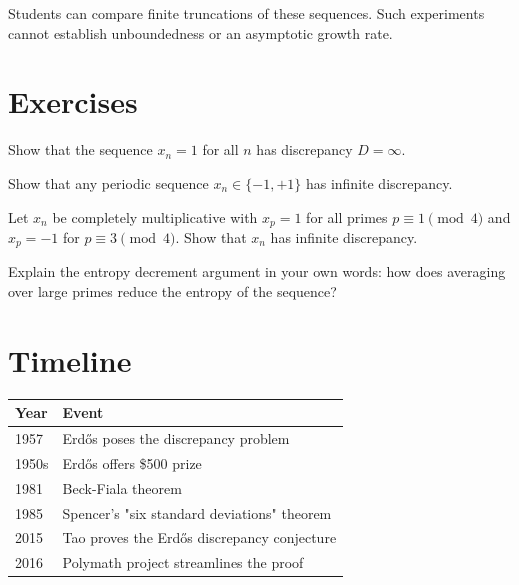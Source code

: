 \begin{highlightbox}
Students can compare finite truncations of these sequences. Such experiments cannot establish unboundedness or an asymptotic growth rate.
\end{highlightbox}

\section{Exercises}

\begin{exercise}[Basic]
Show that the sequence $x_n = 1$ for all $n$ has discrepancy $D = \infty$.
\end{exercise}

\begin{exercise}[Basic]
Show that any periodic sequence $x_n \in \{-1, +1\}$ has infinite discrepancy.
\end{exercise}

\begin{exercise}[Intermediate]
Let $x_n$ be completely multiplicative with $x_p = 1$ for all primes $p \equiv 1 \pmod{4}$ and $x_p = -1$ for $p \equiv 3 \pmod{4}$. Show that $x_n$ has infinite discrepancy.
\end{exercise}

\begin{exercise}[Challenge]
Explain the entropy decrement argument in your own words: how does averaging over large primes reduce the entropy of the sequence?
\end{exercise}

\section{Timeline}

\begin{tabularx}{\linewidth}{lX}
\toprule
\textbf{Year} & \textbf{Event} \\ \midrule
1957 & Erdős poses the discrepancy problem \\ 
1950s & Erdős offers \$500 prize \\ 
1981 & Beck-Fiala theorem \\ 
1985 & Spencer's "six standard deviations" theorem \\ 
2015 & Tao proves the Erdős discrepancy conjecture \\ 
2016 & Polymath project streamlines the proof \\ \bottomrule
\end{tabularx}

